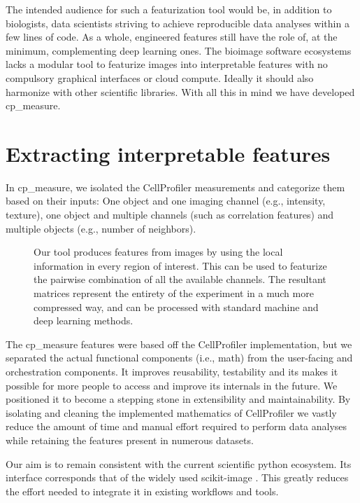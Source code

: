 \documentclass{article}
\begin{document}
The intended audience for such a featurization tool would be, in addition to biologists, data scientists striving to achieve reproducible data analyses within a few lines of code. As a whole, engineered features still have the role of, at the minimum, complementing deep learning ones. The bioimage software ecosystems lacks a modular tool to featurize images into interpretable features with no compulsory graphical interfaces or cloud compute. Ideally it should also harmonize with other scientific libraries. With all this in mind we have developed cp\_measure.
\section{Extracting interpretable features}
\label{sec:org61842b5}
In cp\_measure, we isolated the CellProfiler measurements and categorize them based on their inputs: One object and one imaging channel (e.g., intensity, texture), one object and multiple channels (such as correlation features) and multiple objects (e.g., number of neighbors).

\begin{figure}[htbp]
\centering

\caption{\label{fig:overview}Our tool produces features from images by using the local information in every region of interest. This can be used to featurize the pairwise combination of all the available channels. The resultant matrices represent the entirety of the experiment in a much more compressed way, and can be processed with standard machine and deep learning methods.}
\end{figure}

The cp\_measure features were based off the CellProfiler implementation, but we separated the actual functional components (i.e., math) from the user-facing and orchestration components. It improves reusability, testability and its makes it possible for more people to access and improve its internals in the future. We positioned it to become a stepping stone in extensibility and maintainability. By isolating and cleaning the implemented mathematics of CellProfiler we vastly reduce the amount of time and manual effort required to perform data analyses while retaining the features present in numerous datasets.

Our aim is to remain consistent with the current scientific python ecosystem. Its interface corresponds that of the widely used scikit-image \citep{waltScikitimageImageProcessing2014}. This greatly reduces the effort needed to integrate it in existing workflows and tools.
\end{document}
